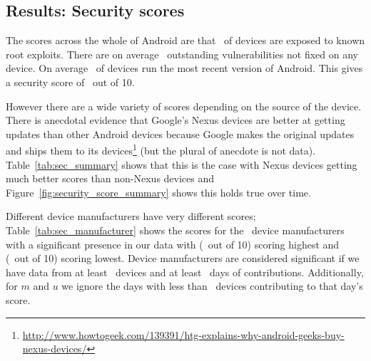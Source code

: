 
\subsection{Results: Security scores}\label{sec:security_scoring:results}
The scores across the whole of Android are that \daMeanInsecurityPerc\ of devices are exposed to known root exploits.
There are on average \daMeanOutstandingVulnerabilities\ outstanding vulnerabilities not fixed on any device.
On average \daUpdatednessPerc\ of devices run the most recent version of Android.
This gives a security score of \daSecurityScore\ out of 10.

However there are a wide variety of scores depending on the source of the device.
There is anecdotal evidence that Google's Nexus devices are better at getting updates than other Android devices because Google makes the original updates and ships them to its devices\footnote{\url{http://www.howtogeek.com/139391/htg-explains-why-android-geeks-buy-nexus-devices/}} (but the plural of anecdote is not data).
Table~\ref{tab:sec_summary} shows that this is the case with Nexus devices getting much better scores than non-Nexus devices and Figure~\ref{fig:security_score_summary} shows this holds true over time.

Different device manufacturers have very different scores; Table~\ref{tab:sec_manufacturer} shows the scores for the \daNumSigManufacturers\ device manufacturers with a significant presence in our data with \emph{\daSecScoreBestmanufacturer} (\daSecScoreBestmanufacturerScore\ out of 10) scoring highest and \emph{\daSecScoreWorstmanufacturer} (\daSecScoreWorstmanufacturerScore\ out of 10) scoring lowest.
Device manufacturers are considered significant if we have data from at least \daSigNumDevices\ devices and at least \daSigNumDeviceDays\ days of contributions.
Additionally, for $m$ and $u$ we ignore the days with less than \daSigNumDevicesDay\ devices contributing to that day's score.

\daTabSecScoressummary
\daTabSecScoresmanufacturer
\daTabSecScoresmodel
\daTabSecScoresoperator

